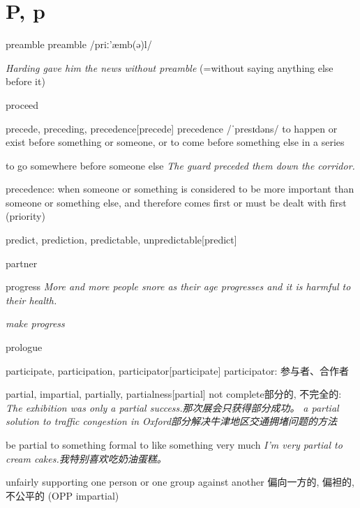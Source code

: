 \section{P, p}

\begin{DefWord}{preamble}
    preamble /priː'æmb(ə)l/

\textit{Harding gave him the news without preamble} (=without saying anything else before it)
\end{DefWord}

\begin{DefWord}{proceed}
\end{DefWord}

\begin{DefWord}{precede, preceding, precedence}[precede]
    precedence /ˈpresɪdəns/
    to happen or exist before something or someone, or to come before something else in a series

    to go somewhere before someone else
    \textit{The guard preceded them down the corridor.}

    precedence: when someone or something is considered to be more important than someone or something else, and therefore comes first or must be dealt with first (priority)
\end{DefWord}


\begin{DefWord}{predict, prediction, predictable, unpredictable}[predict]
\end{DefWord}

\begin{DefWord}{partner}
\end{DefWord}

\begin{DefWord}{progress}
    \textit{More and more people snore as their age progresses and it is harmful to their health.}

    \textit{make progress}
\end{DefWord}

\begin{DefWord}{prologue}
\end{DefWord}

\begin{DefWord}{participate, participation, participator}[participate]
    participator: 参与者、合作者
\end{DefWord}

\begin{DefWord}{partial, impartial, partially, partialness}[partial]
    not complete部分的, 不完全的:
    \textit{The exhibition was only a partial success.那次展会只获得部分成功。 }
    \textit{a partial solution to traffic congestion in Oxford部分解决牛津地区交通拥堵问题的方法}

    be partial to something formal to like something very much
    \textit{I'm very partial to cream cakes.我特别喜欢吃奶油蛋糕。 }

    unfairly supporting one person or one group against another 偏向一方的, 偏袒的, 不公平的 (OPP impartial)
\end{DefWord}

